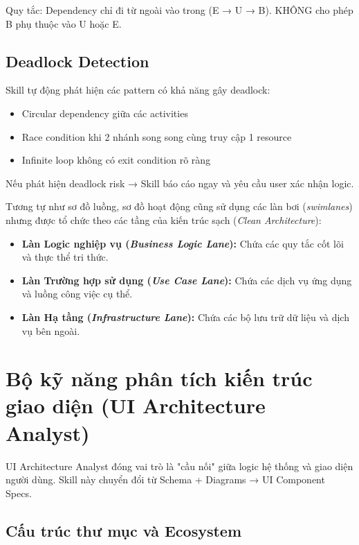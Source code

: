 \documentclass[13pt,a4paper,oneside]{extreport}
\numberwithin{equation}{chapter}
\numberwithin{figure}{chapter}
\numberwithin{table}{chapter}
\begin{document}
Quy tắc: Dependency chỉ đi từ ngoài vào trong (E → U → B). KHÔNG cho phép B phụ thuộc vào U hoặc E.

\subsection{Deadlock Detection}

Skill tự động phát hiện các pattern có khả năng gây deadlock:

\begin{itemize}
    \item Circular dependency giữa các activities
    \item Race condition khi 2 nhánh song song cùng truy cập 1 resource
    \item Infinite loop không có exit condition rõ ràng
\end{itemize}

Nếu phát hiện deadlock risk → Skill báo cáo ngay và yêu cầu user xác nhận logic.

Tương tự như sơ đồ luồng, sơ đồ hoạt động cũng sử dụng các làn bơi (\textit{swimlanes}) nhưng được tổ chức theo các tầng của kiến trúc sạch (\textit{Clean Architecture}):

\begin{itemize}
    \item \textbf{Làn Logic nghiệp vụ (\textit{Business Logic Lane}):} Chứa các quy tắc cốt lõi và thực thể tri thức.
    \item \textbf{Làn Trường hợp sử dụng (\textit{Use Case Lane}):} Chứa các dịch vụ ứng dụng và luồng công việc cụ thể.
    \item \textbf{Làn Hạ tầng (\textit{Infrastructure Lane}):} Chứa các bộ lưu trữ dữ liệu và dịch vụ bên ngoài.
\end{itemize}

\section{Bộ kỹ năng phân tích kiến trúc giao diện (UI Architecture Analyst)}

UI Architecture Analyst đóng vai trò là "cầu nối" giữa logic hệ thống và giao diện người dùng. Skill này chuyển đổi từ Schema + Diagrams → UI Component Specs.

\subsection{Cấu trúc thư mục và Ecosystem}
\end{document}
